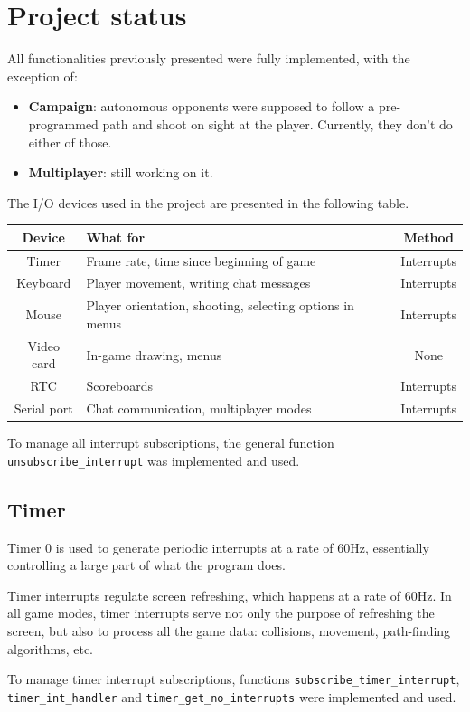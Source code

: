 \documentclass{article}
\theoremstyle{remark}
\begin{document}
\section{Project status}
All functionalities previously presented were fully implemented, with the exception of:
\begin{itemize}
	\item \textbf{Campaign}: autonomous opponents were supposed to follow a pre-programmed path and shoot on sight at the player. Currently, they don't do either of those.
	\item \textbf{Multiplayer}: still working on it.
\end{itemize}
The I/O devices used in the project are presented in the following table.
\begin{center} \begin{tabular}{c || l | c}
	\textbf{Device} & \textbf{What for}                                        & Method \\ \hline
	Timer           & Frame rate, time since beginning of game                 & Interrupts \\
	Keyboard        & Player movement, writing chat messages                   & Interrupts \\
	Mouse           & Player orientation, shooting, selecting options in menus & Interrupts \\
	Video card      & In-game drawing, menus                                   & None \\
	RTC             & Scoreboards                                              & Interrupts \\
	Serial port     & Chat communication, multiplayer modes                    & Interrupts
\end{tabular} \end{center}
To manage all interrupt subscriptions, the general function \texttt{unsubscribe\_interrupt} was implemented and used.
\subsection{Timer}
Timer 0 is used to generate periodic interrupts at a rate of 60Hz, essentially controlling a large part of what the program does.\par
Timer interrupts regulate screen refreshing, which happens at a rate of 60Hz. In all game modes, timer interrupts serve not only the purpose of refreshing the screen, but also to process all the game data: collisions, movement, path-finding algorithms, etc. \par
To manage timer interrupt subscriptions, functions \texttt{subscribe\_timer\_interrupt}, \texttt{timer\_int\_handler} and \texttt{timer\_get\_no\_interrupts} were implemented and used.
\end{document}
